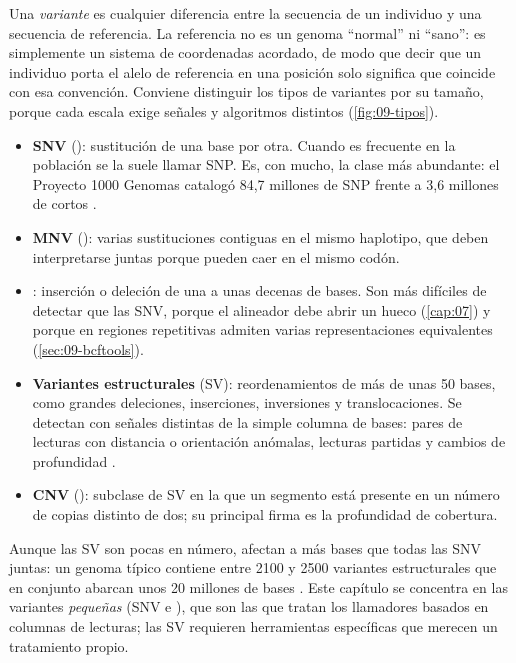 Una \emph{variante} es cualquier diferencia entre la secuencia de un individuo y una secuencia de referencia. La referencia no es un genoma ``normal'' ni ``sano'': es simplemente un sistema de coordenadas acordado, de modo que decir que un individuo porta el alelo de referencia en una posición solo significa que coincide con esa convención. Conviene distinguir los tipos de variantes por su tamaño, porque cada escala exige señales y algoritmos distintos (\cref{fig:09-tipos}).

\begin{itemize}
  \item \textbf{SNV} (): sustitución de una base por otra. Cuando es frecuente en la población se la suele llamar SNP. Es, con mucho, la clase más abundante: el Proyecto 1000 Genomas catalogó 84,7 millones de SNP frente a 3,6 millones de  cortos \parencite{c09-auton2015}.
  \item \textbf{MNV} (): varias sustituciones contiguas en el mismo haplotipo, que deben interpretarse juntas porque pueden caer en el mismo codón.
  \item \textbf{}: inserción o deleción de una a unas decenas de bases. Son más difíciles de detectar que las SNV, porque el alineador debe abrir un hueco (\cref{cap:07}) y porque en regiones repetitivas admiten varias representaciones equivalentes (\cref{sec:09-bcftools}).
  \item \textbf{Variantes estructurales} (SV): reordenamientos de más de unas 50 bases, como grandes deleciones, inserciones, inversiones y translocaciones. Se detectan con señales distintas de la simple columna de bases: pares de lecturas con distancia o orientación anómalas, lecturas partidas y cambios de profundidad \parencite{c09-alkan2011}.
  \item \textbf{CNV} (): subclase de SV en la que un segmento está presente en un número de copias distinto de dos; su principal firma es la profundidad de cobertura.
\end{itemize}

Aunque las SV son pocas en número, afectan a más bases que todas las SNV juntas: un genoma típico contiene entre \num{2100} y \num{2500} variantes estructurales que en conjunto abarcan unos 20 millones de bases \parencite{c09-auton2015}. Este capítulo se concentra en las variantes \emph{pequeñas} (SNV e ), que son las que tratan los llamadores basados en columnas de lecturas; las SV requieren herramientas específicas que merecen un tratamiento propio.

